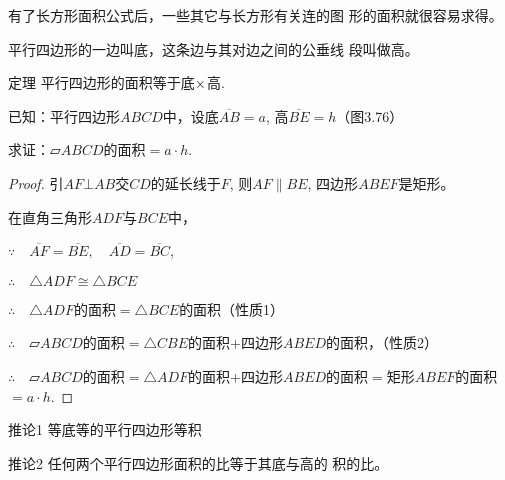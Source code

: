    有了长方形面积公式后，一些其它与长方形有关连的图
    形的面积就很容易求得。

    平行四边形的一边叫底，这条边与其对边之间的公垂线
    段叫做高。

\begin{blk}
    {定理}
平行四边形的面积等于底$\times$高.
\end{blk}

已知：平行四边形$ABCD$中，设底$\overline{AB}=a$, 高$\overline{BE}=h$（图3.76）

求证：$\parallelogram ABCD$的面积$=a\cdot h$.

\begin{figure}[htp]
    \centering
    \caption{}
\end{figure}

\begin{proof}
    引$AF\bot AB$交$CD$的延长线于$F$, 
    则$AF\parallel BE$, 四边形$ABEF$是矩形。

    在直角三角形$ADF$与$BCE$中，

$\because\quad \overline{AF}=\overline{BE},\quad \overline{AD}=\overline{BC}$,

$\therefore\quad     \triangle ADF\cong \triangle BCE$

$\therefore\quad \triangle ADF$的面积$=\triangle BCE$的面积（性质1）

$\therefore\quad \parallelogram ABCD$的面积$=\triangle CBE$的面积$+$四边形$ABED$的面积，（性质2）

$\therefore\quad \parallelogram ABCD$的面积$=\triangle ADF$的面积$+$四边形$ABED$的面积$=$矩形$ABEF$的面积$=a\cdot h$.
\end{proof}


\begin{blk}
    {推论1} 等底等的平行四边形等积
\end{blk}

\begin{blk}
    {推论2} 任何两个平行四边形面积的比等于其底与高的
积的比。
\end{blk}

